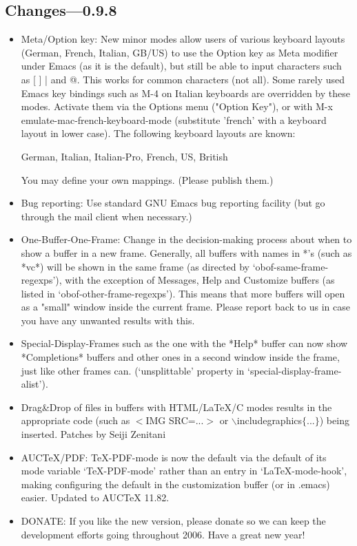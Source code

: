 \subsection{Changes---0.9.8}

\begin{itemize}

\item Meta/Option key: New minor modes allow users of various
	keyboard layouts (German, French, Italian, GB/US) to use the
	Option key as Meta modifier under Emacs (as it is the
	default), but still be able to input characters such as [ ] {
	} | and @. This works for common characters (not all). Some
	rarely used Emacs key bindings such as M-4 on Italian
	keyboards are overridden by these modes. Activate them via the
	Options menu ("Option Key"), or with M-x
	emulate-mac-french-keyboard-mode (substitute 'french' with
	a keyboard layout in lower case).
	The following keyboard layouts are known:

	German, Italian, Italian-Pro, French, US, British

	You may define your own mappings. (Please publish them.)
	
\item Bug reporting: Use standard GNU Emacs bug reporting facility
 	(but go through the mail client when necessary.)

\item One-Buffer-One-Frame: Change in the decision-making process
	about when to show a buffer in a new frame. Generally, all buffers
	with names in *'s (such as *vc*) will be shown in the same
	frame (as directed by `obof-same-frame-regexps'), with the
	exception of Messages, Help and Customize buffers (as listed in
	`obof-other-frame-regexps'). This means that more buffers will
	open as a "small" window inside the current frame. Please report
	back to us in case you have any unwanted results with this.

\item Special-Display-Frames such as the one with the *Help* buffer
	can now show *Completions* buffers and other ones in a second
	window inside the frame, just like other frames can.
 	(`unsplittable' property in `special-display-frame-alist').
	
\item Drag\&Drop of files in buffers with HTML/LaTeX/C modes results in
	the appropriate code (such as $<$IMG SRC=...$>$ or
	$\backslash$includegraphics$\{$...$\}$) being inserted.
	Patches by Seiji Zenitani
	
\item AUCTeX/PDF: TeX-PDF-mode is now the default via the default of
	its mode variable `TeX-PDF-mode' rather than an entry in
	`LaTeX-mode-hook', making configuring the default in the
	customization buffer (or in .emacs) easier. Updated to AUCTeX 11.82.

\item DONATE: If you like the new version, please donate so we can
	keep the development efforts going throughout 2006. Have a great
	new year!
\end{itemize}	

